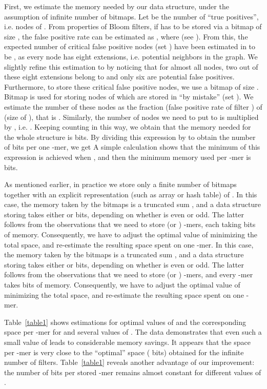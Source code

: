 \documentclass[pdftex]{llncs}\usepackage[T1]{fontenc}
\begin{document}
First, we estimate the memory needed by our data structure, under the assumption of infinite number of bitmaps. Let  be the number of ``true positives'', i.e. nodes of . From properties of Bloom filters, if  has to be stored via a bitmap  of size , the false positive rate can be estimated as , where  (see \cite{Kirsch:2008:LHS:1400123.1400125}). From this, the expected number of critical false positive nodes (set ) have been estimated in \cite{DBLP:conf/wabi/ChikhiR12} to be , as every node has eight extensions, i.e. potential neighbors in the graph. We slightly refine this estimation to  by noticing that for almost all nodes, two out of these eight extensions belong to  and only six are potential false positives.
Furthermore, to store these  critical false positive nodes, we use a bitmap  of size . Bitmap  is used for storing nodes of  which are stored in  ``by mistake'' (set ).
We estimate the number of these nodes as the fraction  (false positive rate of filter ) of  (size of ), that is .
Similarly, the number of nodes we need to put to   is 
multiplied by , i.e. . Keeping counting in this way, we
obtain that the memory needed for the whole structure is  bits. By dividing this expression
by  to obtain the number of bits per one -mer, we get 
 A simple calculation shows that the minimum of this expression is achieved when , and then the minimum memory used per -mer is  bits.

As mentioned earlier, in practice we store only a finite number of bitmaps  together with an explicit representation (such as array or hash table) of .  In this case, the memory taken by the bitmaps is a truncated sum , and a data structure storing  takes either  or  bits, depending on whether  is even or odd. The latter follows from the observations that we need to store  (or ) -mers, each taking  bits of memory. Consequently, we have to adjust the optimal value of  minimizing the total space, and re-estimate the resulting space spent on one -mer.
In this case, the memory taken by the bitmaps is a truncated sum , and a data structure storing  takes either  or  bits, depending on whether  is even or odd. The latter follows from the observations that we need to store  (or ) -mers, and every -mer takes  bits of memory. Consequently, we have to adjust the optimal value of  minimizing the total space, and re-estimate the resulting space spent on one -mer.


Table~\ref{table1} shows estimations for optimal values of  and the corresponding space per -mer for  and several values of . The data demonstrates that even such a small value of  leads to considerable memory savings. It appears that the space per -mer is very close to the ``optimal'' space ( bits) obtained for the infinite number of filters. Table~\ref{table1} reveals another advantage of our improvement: the number of bits per stored -mer remains almost constant for different values of .
\end{document}
